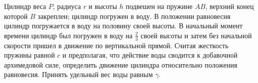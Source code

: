 Цилиндр веса $P$, радиуса $r$ и высоты $h$ подвешен на пружине $AB$, верхний конец которой $B$ закреплен;
цилиндр погружен в воду. В положении равновесия цилиндр погружается в воду на половину своей высоты.
В начальный момент времени цилиндр был погружен в воду на $\frac{2}{3}$ своей высоты и затем без начальной
скорости пришел в движение по вертикальной прямой. Считая жесткость пружины равной $c$ и предполагая, 
что действие воды сводится к добавочной архимедовой силе, определить движение цилиндра относительно положения
равновесия. Принять удельный вес воды равным $\gamma$.
